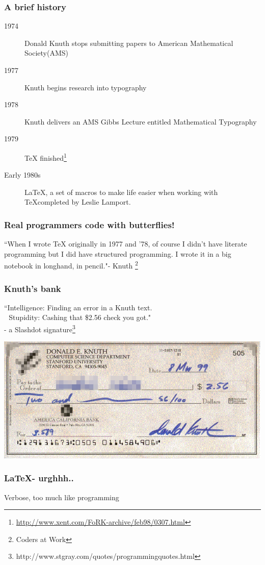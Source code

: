\begin{frame}
	\frametitle{A brief history}
	\begin{description}
		\item[1974] Donald Knuth stops submitting papers to American Mathematical Society(AMS)
		\item[1977] Knuth begins research into typography
		\item[1978] Knuth delivers an AMS Gibbs Lecture entitled Mathematical 
Typography
		\item[1979] \TeX 
finished\footnote{\url{http://www.xent.com/FoRK-archive/feb98/0307.html}}
		\item[Early 1980s] \LaTeX, a set of macros to make life easier when working with \TeX completed by Leslie Lamport. 
	\end{description}
\end{frame}
\begin{frame}
	\frametitle{Real programmers code with butterflies!}
	``When I wrote TeX originally in 1977 and ’78, of course I didn’t have literate programming but I did have structured programming. I wrote it in a big notebook in longhand, in pencil."- Knuth \footnote{Coders at Work}
\end{frame}
\begin{frame}
	\frametitle{Knuth's bank}
``Intelligence: Finding an error in a Knuth text.\\
\,\,\,\,Stupidity: Cashing that \$2.56 check you got." \\- a Slashdot 
signature\footnote{http://www.stgray.com/quotes/programmingquotes.html}

\begin{center}
	\includegraphics[scale=0.3]{hexadollar.png}
\end{center}
\end{frame}

\begin{frame}
	\frametitle{\LaTeX - urghhh..}
	\begin{center}
		\huge
		Verbose, too much like programming
	\end{center}
\end{frame}


